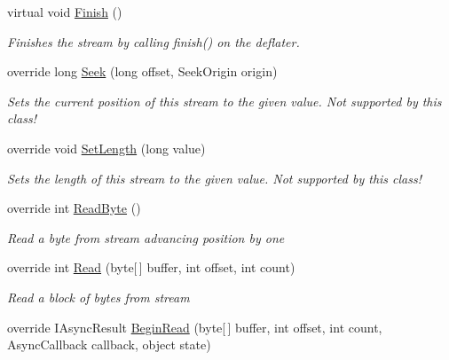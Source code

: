 \begin{DoxyCompactItemize}
virtual void \hyperlink{class_i_c_sharp_code_1_1_sharp_zip_lib_1_1_zip_1_1_compression_1_1_streams_1_1_deflater_output_stream_ac81f3e741a1ffdf98c02a171ad7cb334}{Finish} ()
\begin{DoxyCompactList}\small\item\em Finishes the stream by calling finish() on the deflater. \end{DoxyCompactList}\item 
override long \hyperlink{class_i_c_sharp_code_1_1_sharp_zip_lib_1_1_zip_1_1_compression_1_1_streams_1_1_deflater_output_stream_a8b1da4accf17592cb5fd485fcab1ac26}{Seek} (long offset, Seek\+Origin origin)
\begin{DoxyCompactList}\small\item\em Sets the current position of this stream to the given value. Not supported by this class! \end{DoxyCompactList}\item 
override void \hyperlink{class_i_c_sharp_code_1_1_sharp_zip_lib_1_1_zip_1_1_compression_1_1_streams_1_1_deflater_output_stream_a25af9364b271aaa5f24c56ed45934273}{Set\+Length} (long value)
\begin{DoxyCompactList}\small\item\em Sets the length of this stream to the given value. Not supported by this class! \end{DoxyCompactList}\item 
override int \hyperlink{class_i_c_sharp_code_1_1_sharp_zip_lib_1_1_zip_1_1_compression_1_1_streams_1_1_deflater_output_stream_ac896378769a1ffee535bbaa4596463e3}{Read\+Byte} ()
\begin{DoxyCompactList}\small\item\em Read a byte from stream advancing position by one \end{DoxyCompactList}\item 
override int \hyperlink{class_i_c_sharp_code_1_1_sharp_zip_lib_1_1_zip_1_1_compression_1_1_streams_1_1_deflater_output_stream_ad27c5def75bae066c965f51497b2f91c}{Read} (byte\mbox{[}$\,$\mbox{]} buffer, int offset, int count)
\begin{DoxyCompactList}\small\item\em Read a block of bytes from stream \end{DoxyCompactList}\item 
override I\+Async\+Result \hyperlink{class_i_c_sharp_code_1_1_sharp_zip_lib_1_1_zip_1_1_compression_1_1_streams_1_1_deflater_output_stream_a3f6da03928eb108207125e4c03f26efe}{Begin\+Read} (byte\mbox{[}$\,$\mbox{]} buffer, int offset, int count, Async\+Callback callback, object state)

\end{DoxyCompactItemize}
